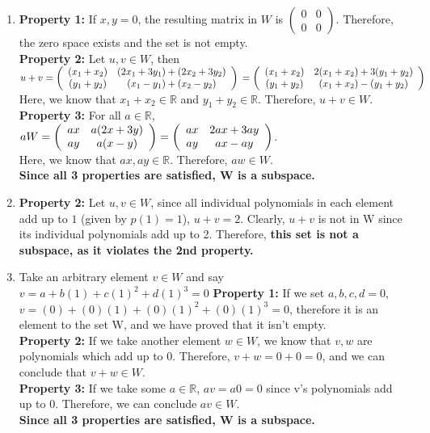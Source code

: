 \documentclass{article}
\begin{document}
\begin{enumerate}
\begin{enumerate}
\item 
\textbf{Property 1:} If $x,y = 0$, the resulting matrix in $W$ is $\left(\begin{array}{cc} 0 & 0 \\ 0 & 0 \end{array} \right)$. Therefore, the zero space exists and the set is not empty. \\
\textbf{Property 2:} Let $u,v \in W$, then $u + v \\ = \left(\begin{array}{cc} (x_1 + x_2) & (2x_1 + 3y_1) + (2x_2 + 3y_2) \\ (y_1 + y_2) & (x_1 - y_1) + (x_2 - y_2) \end{array} \right) \\
= \left(\begin{array}{cc} (x_1 + x_2) & 2(x_1 + x_2) + 3(y_1 + y_2) \\ (y_1 + y_2) & (x_1 + x_2) - (y_1 + y_2) \end{array} \right)$ \\ Here, we know that $x_1 + x_2 \in \mathbb{R}$ and $y_1 + y_2 \in \mathbb{R}$. Therefore, $u + v \in W$. \\
\textbf{Property 3:} For all $a \in \mathbb{R}$, $a W \\ =  \left(\begin{array}{cc} a x & a (2x + 3y) \\ a y & a (x - y)\end{array} \right) 
= \left(\begin{array}{cc} a x & 2 a x + 3 a y \\ a y & a x - a y\end{array} \right)$. \\ Here, we know that $a x, a y \in \mathbb{R}$. Therefore, $aw \in W$. \\
\textbf{Since all 3 properties are satisfied, W is a subspace.}

\item \textbf{Property 2:} Let $u,v \in W$, since all individual polynomials in each element add up to $1$ (given by $p(1) = 1$), $u + v = 2$. Clearly, $u + v$ is not in W since its individual polynomials add up to 2. Therefore, \textbf{this set is not a subspace, as it violates the 2nd property.}

\item Take an arbitrary element $v \in W$ and say $v = a + b(1) + c(1)^2 + d(1)^3 = 0$
\textbf{Property 1:} If we set $a,b,c,d = 0$, $v = (0) + (0)(1) + (0)(1)^2 + (0)(1)^3 = 0$, therefore it is an element to the set W, and we have proved that it isn't empty. \\
\textbf{Property 2:} If we take another element $w \in W$, we know that $v,w$ are polynomials which add up to 0. Therefore, $v + w = 0 + 0 = 0$, and we can conclude that $v + w \in W$. \\
\textbf{Property 3:} If we take some $a \in \mathbb{R}$, $a v = a 0 = 0$ since v's polynomials add up to 0. Therefore, we can conclude $a v \in W$. \\ 
\textbf{Since all 3 properties are satisfied, W is a subspace.}


\end{enumerate}
\end{enumerate}
\end{document}
